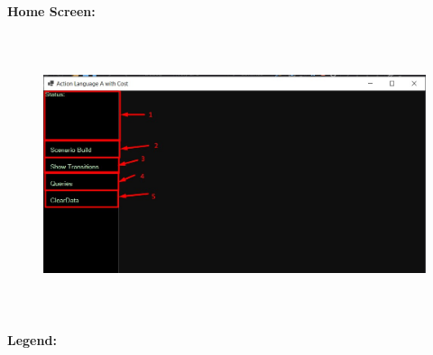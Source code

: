 \documentclass[12pt]{article}
\begin{document}
\vspace{\baselineskip}

\vspace{\baselineskip}
\textbf{Home Screen:}\par

\tab 
\vspace{\baselineskip}


\begin{figure}[H]
	\begin{Center}
		\includegraphics[width=6.27in,height=3.26in]{./media/image3.jpeg}
	\end{Center}
\end{figure}



\par


\vspace{\baselineskip}
\textbf{Legend:}\par
\end{document}
